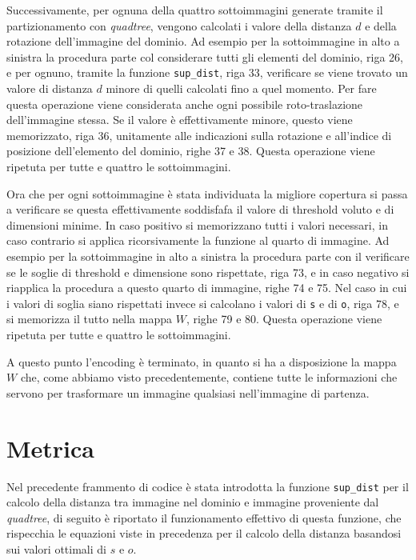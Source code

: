 \documentclass[11pt,a4paper,appendixprefix=true,numbers=noenddot]{scrreprt}
\begin{document}
Successivamente, per ognuna della quattro sottoimmagini generate tramite il partizionamento con \textit{quadtree}, vengono calcolati i valore della distanza $d$ e della rotazione dell'immagine del dominio. Ad esempio per la sottoimmagine in alto a sinistra la procedura parte col considerare tutti gli elementi del dominio, riga 26, e per ognuno, tramite la funzione \texttt{sup\_dist}, riga 33, verificare se viene trovato un valore di distanza $d$ minore di quelli calcolati fino a quel momento. Per fare questa operazione viene considerata anche ogni possibile roto-traslazione dell'immagine stessa. Se il valore è effettivamente minore, questo viene memorizzato, riga 36, unitamente alle indicazioni sulla rotazione e all'indice di posizione dell'elemento del dominio, righe 37 e 38. Questa operazione viene ripetuta per tutte e quattro le sottoimmagini.

Ora che per ogni sottoimmagine è stata individuata la migliore copertura si passa a verificare se questa effettivamente soddisfafa il valore di threshold voluto e di dimensioni minime. In caso positivo si memorizzano tutti i valori necessari, in caso contrario si applica ricorsivamente la funzione al quarto di immagine. Ad esempio per la sottoimmagine in alto a sinistra la procedura parte con il verificare se le soglie di threshold e dimensione sono rispettate, riga 73, e in caso negativo si riapplica la procedura a questo quarto di immagine, righe 74 e 75. Nel caso in cui i valori di soglia siano rispettati invece si calcolano i valori di \texttt{s} e di \texttt{o}, riga 78, e si memorizza il tutto nella mappa $W$, righe 79 e 80.  Questa operazione viene ripetuta per tutte e quattro le sottoimmagini.

A questo punto l'encoding è terminato, in quanto si ha a disposizione la mappa $W$ che, come abbiamo visto precedentemente, contiene tutte le informazioni che servono per trasformare un immagine qualsiasi nell'immagine di partenza.

\section{Metrica}

Nel precedente frammento di codice è stata introdotta la funzione \texttt{sup\_dist} per il calcolo della distanza tra immagine nel dominio e immagine proveniente dal \textit{quadtree}, di seguito è riportato il funzionamento effettivo di questa funzione, che rispecchia le equazioni viste in precedenza per il calcolo della distanza basandosi sui valori ottimali di $s$ e $o$.
\end{document}

